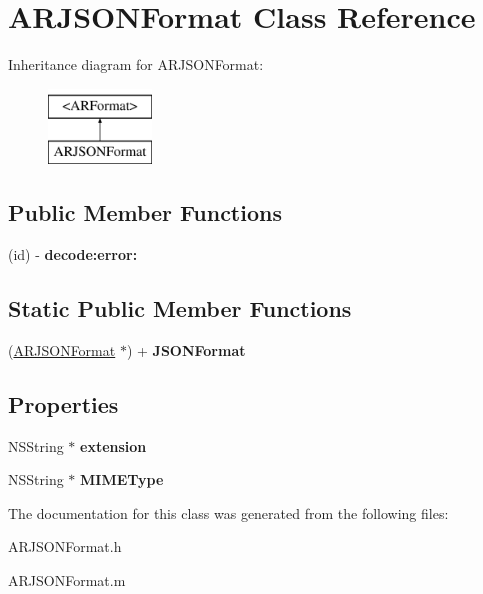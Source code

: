 \hypertarget{interface_a_r_j_s_o_n_format}{
\section{\-A\-R\-J\-S\-O\-N\-Format \-Class \-Reference}
\label{interface_a_r_j_s_o_n_format}
}
\-Inheritance diagram for \-A\-R\-J\-S\-O\-N\-Format\-:\begin{figure}[H]
\begin{center}
\leavevmode
\includegraphics[height=2.000000cm]{interface_a_r_j_s_o_n_format}
\end{center}
\end{figure}
\subsection*{\-Public \-Member \-Functions}
\begin{DoxyCompactItemize}
\item 
\hypertarget{interface_a_r_j_s_o_n_format_a159f58fb068d2e7f1ffe77b735e8c2e1}{
(id) -\/ {\bfseries decode\-:error\-:}}
\label{interface_a_r_j_s_o_n_format_a159f58fb068d2e7f1ffe77b735e8c2e1}

\end{DoxyCompactItemize}
\subsection*{\-Static \-Public \-Member \-Functions}
\begin{DoxyCompactItemize}
\item 
\hypertarget{interface_a_r_j_s_o_n_format_a7bf04c4f354e58320612a65b2973207a}{
(\hyperlink{interface_a_r_j_s_o_n_format}{\-A\-R\-J\-S\-O\-N\-Format} $\ast$) + {\bfseries \-J\-S\-O\-N\-Format}}
\label{interface_a_r_j_s_o_n_format_a7bf04c4f354e58320612a65b2973207a}

\end{DoxyCompactItemize}
\subsection*{\-Properties}
\begin{DoxyCompactItemize}
\item 
\hypertarget{interface_a_r_j_s_o_n_format_ad7ea03657677e9b4d7042ec8d104f0d7}{
\-N\-S\-String $\ast$ {\bfseries extension}}
\label{interface_a_r_j_s_o_n_format_ad7ea03657677e9b4d7042ec8d104f0d7}

\item 
\hypertarget{interface_a_r_j_s_o_n_format_a7d60cc0897ce7f472ae796f7c3ea6bc1}{
\-N\-S\-String $\ast$ {\bfseries \-M\-I\-M\-E\-Type}}
\label{interface_a_r_j_s_o_n_format_a7d60cc0897ce7f472ae796f7c3ea6bc1}

\end{DoxyCompactItemize}


\-The documentation for this class was generated from the following files\-:\begin{DoxyCompactItemize}
\item 
\-A\-R\-J\-S\-O\-N\-Format.\-h\item 
\-A\-R\-J\-S\-O\-N\-Format.\-m\end{DoxyCompactItemize}
